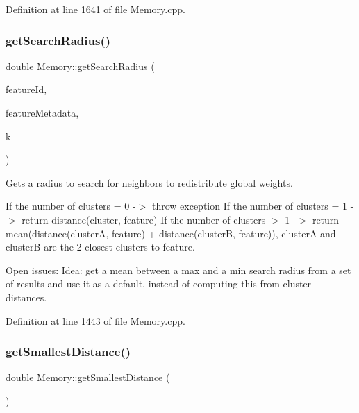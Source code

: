 Definition at line 1641 of file Memory.\+cpp.

\mbox{\label{class_memory_af45cd527f0c6fad40154e19b42d8fce3}} 
\subsubsection{\texorpdfstring{get\+Search\+Radius()}{getSearchRadius()}}
{\footnotesize\ttfamily double Memory\+::get\+Search\+Radius (\begin{DoxyParamCaption}\item[{int}]{feature\+Id,  }\item[{\hyperlink{class_feature_metadata}{Feature\+Metadata} \&}]{feature\+Metadata,  }\item[{int}]{k }\end{DoxyParamCaption})\hspace{0.3cm}{\ttfamily [protected]}}

Gets a radius to search for neighbors to redistribute global weights.

If the number of clusters = 0 -\/$>$ throw exception If the number of clusters = 1 -\/$>$ return distance(cluster, feature) If the number of clusters $>$ 1 -\/$>$ return mean(distance(cluster\+A, feature) + distance(cluster\+B, feature)), clusterA and clusterB are the 2 closest clusters to feature.

Open issues\+: Idea\+: get a mean between a max and a min search radius from a set of results and use it as a default, instead of computing this from cluster distances. 

Definition at line 1443 of file Memory.\+cpp.

\mbox{\label{class_memory_aaf033cd124262162565795054e4051c9}} 
\subsubsection{\texorpdfstring{get\+Smallest\+Distance()}{getSmallestDistance()}}
{\footnotesize\ttfamily double Memory\+::get\+Smallest\+Distance (\begin{DoxyParamCaption}{ }\end{DoxyParamCaption})\hspace{0.3cm}{\ttfamily [inline]}}



